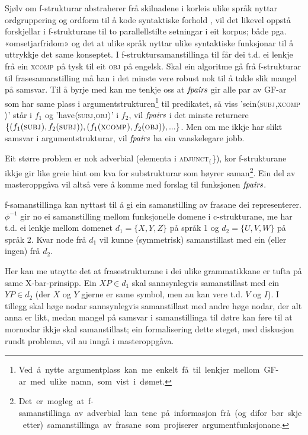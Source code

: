 \documentclass[11pt,a4paper,oneside,draft]{book}
\newcommand{\F}[2]{\textsc{#1}\ensuremath{_{#2}}}
\newcommand{\OBJ}{\F{obj}{}}
\newcommand{\XCOMP}{\F{xcomp}{}}
\newcommand{\SUBJ}{\F{subj}{}}
\newcommand{\fpairs}{\ensuremath{\operatorname{\emph{fpairs}}}}
\begin{document}
Sjølv om f-strukturar abstraherer frå skilnadene i korleis ulike språk
nyttar ordgruppering og ordform til å kode syntaktiske forhold
\citep[s.~14]{bresnan2001lfs}, vil det likevel oppstå forskjellar i
f-strukturane til to parallellstilte setningar i eit korpus; både
pga. «omsetjarfridom» og det at ulike språk nyttar ulike syntaktiske
funksjonar til å uttrykkje det same konseptet. I
f-struktursamanstillinga til \citet[s.~40]{riezler2006gmt} får dei
t.d. ei lenkje frå ein \XCOMP{} på tysk til eit \OBJ{} på
engelsk. Skal ein algoritme gå frå f-strukturar til frasesamanstilling
må han i det minste vere robust nok til å takle slik mangel på
samsvar. Til å byrje med kan me tenkje oss at \fpairs{} gir alle par
av GF-ar som har same plass i
argumentstrukturen\footnote{Ved~å~nytte~argumentplass~kan~me~enkelt~få~til~lenkjer~mellom~GF-ar~med~ulike~namn,~som~vist~i~dømet.}
til predikatet, så viss 'sein$\langle$\SUBJ,\XCOMP$\rangle$' står i
$f_{1}$ og 'have$\langle$\SUBJ,\OBJ$\rangle$' i $f_{2}$, vil \fpairs{}
i det minste returnere
$\{(f_{1}(\SUBJ),f_{2}(\SUBJ)),(f_{1}(\XCOMP),f_{2}(\OBJ)),...\}$.
Men om me ikkje har slikt samsvar i argumentstrukturar, vil \fpairs{}
ha ein vanskelegare jobb.

Eit større problem er nok adverbial (elementa i \F{adjunct}\{\}), kor
f-strukturane ikkje gir like greie hint om kva for substrukturar som
høyrer
saman\footnote{Det~er~mogleg~at~f-samanstillinga~av~adverbial~kan~tene~på~informasjon~frå~(og~difor~bør~skje~etter)~samanstillinga~av~frasane~som~projiserer~argumentfunksjonane.}. Ein
del av masteroppgåva vil altså vere å komme med forslag til funksjonen
\fpairs{}.


f-samanstillinga kan nyttast til å gi ein samanstilling av frasane dei
representerer. $\phi^{-1}$ gir no ei samanstilling mellom funksjonelle
domene i c-strukturane, me har t.d. ei lenkje mellom domenet
$d_{1}=\{X, Y, Z\}$ på språk 1 og $d_{2}=\{U, V, W\}$ på språk 2. Kvar
node frå $d_{1}$ vil kunne (symmetrisk) samanstillast med ein (eller
ingen) frå $d_{2}$.

Her kan me utnytte det at frasestrukturane i dei ulike grammatikkane
er tufta på same X-bar-prinsipp. Ein $XP\in d_{1}$ skal sannsynlegvis
samanstillast med ein $YP\in d_{2}$ (der $X$ og $Y$ gjerne er same
symbol, men au kan vere t.d. $V$ og $I$). I tillegg skal høge nodar
sannsynlegvis samanstillast med andre høge nodar, der alt anna er
likt, medan mangel på samsvar i samanstillinga til døtre kan føre til
at mornodar ikkje skal samanstillast; ein formalisering dette steget,
med diskusjon rundt problema, vil au inngå i masteroppgåva.
\end{document}
